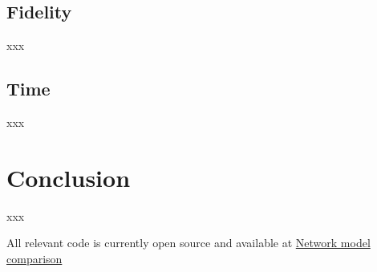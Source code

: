 \documentclass{article}
\begin{document}
\begin{multicols}{2}
    \subsection*{Fidelity}
    xxx

    \subsection*{Time}
    xxx


    \section{Conclusion}
    xxx

    All relevant code is currently open source and available at \href{https://github.com/mgg39/Network-model-comparison}{Network model comparison}

    
    

\end{multicols}
\end{document}
